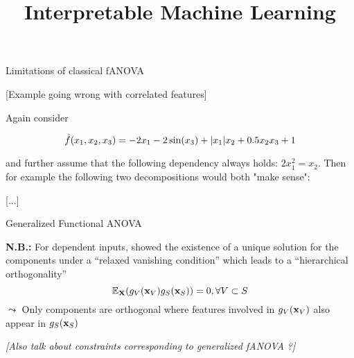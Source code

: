 \documentclass[11pt,compress,t,notes=noshow, aspectratio=169, xcolor=table]{beamer}
\title{Interpretable Machine Learning}
\date{}
\begin{document}
\newcommand{\titlefigure}{figure/open_blackbox}
\newcommand{\learninggoals}{
\item Limitations of classical fANOVA
\item Overcoming these limitations with generalized fANOVA
\item How ALE Plots can be used as another, different approach to obtain functional decompositions
\item Sobol-Hoeffding decomposition ??}


\begin{frame}{Limitations of classical fANOVA}

    [Example going wrong with correlated features]

    \begin{example}

        Again consider

        \begin{equation*}
            \hat{f}(x_1, x_2, x_3) = - 2x_1 - 2\sin(x_3) + |x_1|x_2 + 0.5 x_2 x_3 +1
        \end{equation*}

        and further assume that the following dependency always holds: \(2x_1^2 = x_2\). Then for example the following two decompositions would both "make sense":
        
    \end{example}

    [...]

    
    
\end{frame}

\begin{frame}{Generalized Functional ANOVA}

    \textbf{N.B.:} For dependent inputs,  showed the existence of a unique solution for the components under a ``relaxed vanishing condition'' which leads to a ``hierarchical orthogonality''
    $$\mathbb{E}_{\mathbf{X}} (g_{V}(\mathbf{x}_V) g_{S}(\mathbf{x}_S)) = 0, \forall V \subset S$$
    $\leadsto$ Only components are orthogonal where features involved in $g_{V}(\mathbf{x}_V)$ also appear in $g_{S}(\mathbf{x}_S)$

    \pause

    \textit{[Also talk about constraints corresponding to generalized fANOVA ?]}
    
\end{frame}
\end{document}
